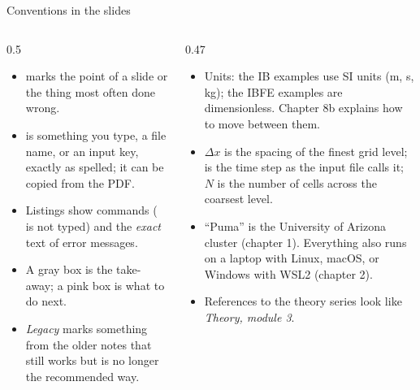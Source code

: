 \documentclass[aspectratio=169,11pt]{beamer}
\begin{document}
\begin{frame}{Conventions in the slides}
\begin{columns}[T,onlytextwidth]
\begin{column}{0.5\textwidth}
\begin{itemize}
  \item {} marks the point of a slide or the thing most often done wrong.
  \item {} is something you type, a file name, or an input key, exactly as spelled; it can be copied from the PDF.
  \item Listings show commands (\code{\$} is not typed) and the \emph{exact} text of error messages.
  \item A gray box is the take-away; a pink box is what to do next.
  \item \emph{Legacy} marks something from the older notes that still works but is no longer the recommended way.
\end{itemize}
\end{column}
\begin{column}{0.47\textwidth}
\begin{itemize}
  \item Units: the IB examples use SI units (m, s, kg); the IBFE examples are dimensionless. Chapter 8b explains how to move between them.
  \item $\Delta x$ is the spacing of the finest grid level;  is the time step as the input file calls it; $N$ is the number of cells across the coarsest level.
  \item ``Puma'' is the University of Arizona cluster (chapter 1). Everything also runs on a laptop with Linux, macOS, or Windows with WSL2 (chapter 2).
  \item References to the theory series look like \emph{Theory, module 3}.
\end{itemize}
\end{column}
\end{columns}
\end{frame}
\end{document}
